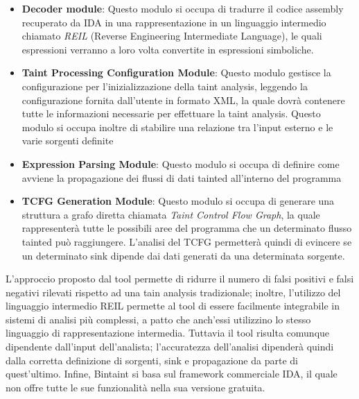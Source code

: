 \documentclass[../main.tex]{subfiles}
\begin{document}
\begin{itemize}
    \item \textbf{Decoder module}: Questo modulo si occupa di tradurre il codice assembly recuperato da IDA in una rappresentazione in un linguaggio intermedio chiamato \textit{REIL} (Reverse Engineering Intermediate Language), 
    le quali espressioni verranno a loro volta convertite in espressioni simboliche.
    \item \textbf{Taint Processing Configuration Module}: Questo modulo gestisce la configurazione per l'inizializzazione della taint analysis, leggendo la configurazione fornita dall'utente in formato XML, la quale
    dovrà contenere tutte le informazioni necessarie per effettuare la taint analysis. Questo modulo si occupa inoltre di stabilire una relazione tra l'input esterno e le varie sorgenti definite
    \item \textbf{Expression Parsing Module}: Questo modulo si occupa di definire come avviene la propagazione dei flussi di dati tainted all'interno del programma
    \item \textbf{TCFG Generation Module}: Questo modulo si occupa di generare una struttura a grafo diretta chiamata \textit{Taint Control Flow Graph}, la quale rappresenterà tutte le possibili aree del programma che un determinato flusso tainted può raggiungere.
    L'analisi del TCFG permetterà quindi di evincere se un determinato sink dipende dai dati generati da una determinata sorgente.
\end{itemize}
L'approccio proposto dal tool permette di ridurre il numero di falsi positivi e falsi negativi rilevati rispetto ad una tain analysis tradizionale; inoltre, l'utilizzo del linguaggio intermedio REIL
permette al tool di essere facilmente integrabile in sistemi di analisi più complessi, a patto che anch'essi utilizzino lo stesso linguaggio di rappresentazione intermedia. 
Tuttavia il tool risulta comunque dipendente dall'input dell'analista; l'accuratezza dell'analisi dipenderà quindi dalla corretta definizione di sorgenti, sink e propagazione da parte
di quest'ultimo. Infine, Bintaint si basa sul framework commerciale IDA, il quale non offre tutte le sue funzionalità nella sua versione gratuita.
\end{document}
